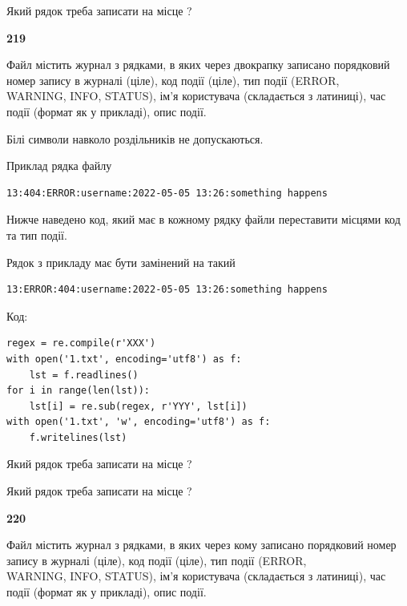Який рядок треба записати на місце  ?\par


\newpage

{\begin {center}\textbf{ 219}\end {center}}\par
Файл  містить журнал з рядками, в яких через двокрапку записано поряд\-ко\-вий номер запису в журналі (ціле), код події (ціле), тип події (ERROR,\\ WARNING, INFO, STATUS), ім'я користувача (складається з латиниці), час події (фор\-мат як у прикладі), опис події.

Білі символи навколо роздільників не допускаються.

Приклад рядка файлу



\begin{verbatim}
13:404:ERROR:username:2022-05-05 13:26:something happens
\end{verbatim}


Нижче наведено код, який має в кожному рядку файли переставити місцями код та тип події.

Рядок з прикладу має бути замінений на такий



\begin{verbatim}
13:ERROR:404:username:2022-05-05 13:26:something happens
\end{verbatim}




Код:



\begin{verbatim}
regex = re.compile(r'XXX')
with open('1.txt', encoding='utf8') as f:
    lst = f.readlines()
for i in range(len(lst)):
    lst[i] = re.sub(regex, r'YYY', lst[i])
with open('1.txt', 'w', encoding='utf8') as f:
    f.writelines(lst)
\end{verbatim}







Який рядок треба записати на місце  ?\par
\vspace{5mm}


Який рядок треба записати на місце  ?\par


\newpage

{\begin {center}\textbf{ 220}\end {center}}\par
Файл  містить журнал з рядками, в яких через кому записано поряд\-ко\-вий номер запису в журналі (ціле), код події (ціле), тип події (ERROR, \\WARNING, INFO, STATUS), ім'я користувача (складається з латиниці), час події (фор\-мат як у прикладі), опис події.

